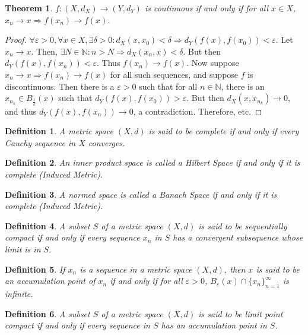 \documentclass[12pt,oneside]{book}
\theoremstyle{mystyle}
\newtheorem{theorem}{Theorem}[section]
\newtheorem{definition}{Definition}[section]
\begin{document}
\begin{theorem}
$f:(X,d_X)\rightarrow (Y,d_Y)$ is continuous if and only if for all $x\in X$, $x_n\rightarrow x \Rightarrow f(x_n)\rightarrow f(x)$.
\end{theorem}
\begin{proof}
$\forall \varepsilon>0,\forall x\in X,\exists \delta>0:d_X(x,x_0)<\delta \Rightarrow d_Y(f(x),f(x_0))<\varepsilon$. Let $x_n \rightarrow x$. Then, $\exists N\in \mathbb{N}:n>N \Rightarrow d_X(x_n,x)<\delta$. But then $d_Y(f(x),f(x_n)) < \varepsilon$. Thus $f(x_n)\rightarrow f(x)$. Now suppose $x_n\rightarrow x \Rightarrow f(x_n)\rightarrow f(x)$ for all such sequences, and suppose $f$ is discontinuous. Then there is a $\varepsilon>0$ such that for all $n\in \mathbb{N}$, there is an $x_{n_k} \in B_{\frac{1}{k}}(x)$ such that $d_Y(f(x),f(x_0))>\varepsilon$. But then $d_X(x,x_{n_k})\rightarrow 0$, and thus $d_Y(f(x),f(x_n))\rightarrow 0$, a contradiction. Therefore, etc.
\end{proof}

\begin{definition}
A metric space $(X,d)$ is said to be complete if and only if every Cauchy sequence in $X$ converges.
\end{definition}

\begin{definition}
An inner product space is called a Hilbert Space if and only if it is complete (Induced Metric).
\end{definition}

\begin{definition}
A normed space is called a Banach Space if and only if it is complete (Induced Metric).
\end{definition}

\begin{definition}
A subset $S$ of a metric space $(X,d)$ is said to be sequentially compact if and only if every sequence $x_n$ in $S$ has a convergent subsequence whose limit is in $S$.
\end{definition}

\begin{definition}
If $x_n$ is a sequence in a metric space $(X,d)$, then $x$ is said to be an accumulation point of $x_n$ if and only if for all $\varepsilon>0$, $B_{\varepsilon}(x)\cap \{x_n\}_{n=1}^{\infty}$ is infinite.
\end{definition}

\begin{definition}
A subset $S$ of a metric space $(X,d)$ is said to be limit point compact if and only if every sequence in $S$ has an accumulation point in $S$.
\end{definition}
\end{document}
